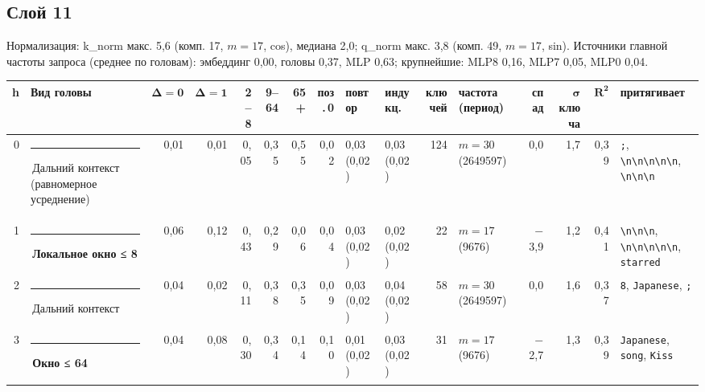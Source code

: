 \documentclass[10pt]{article}
\begin{document}
\noindent\begin{minipage}{\linewidth}
\subsection*{Слой 11}
{\small\color{ink2} Нормализация: k\_norm макс. 5,6 (комп. 17, $m{=}17$, cos), медиана 2,0; q\_norm макс. 3,8 (комп. 49, $m{=}17$, sin). Источники главной частоты запроса (среднее по головам): эмбеддинг 0,00, головы 0,37, MLP 0,63; крупнейшие: MLP8 0,16, MLP7 0,05, MLP0 0,04.}
\begin{center}{\footnotesize\begin{tabular}{|r|l|r|r|r|r|r|r|l|l|r|l|r|r|r|l|}
\hline
\rowcolor{head}\textbf{h} & \textbf{Вид головы} & $\boldsymbol{\Delta{=}0}$ & $\boldsymbol{\Delta{=}1}$ & \textbf{2–8} & \textbf{9–64} & \textbf{65+} & \textbf{поз.\,0} & \textbf{повтор} & \textbf{индукц.} & \textbf{ключей} & \textbf{частота (период)} & \textbf{спад} & $\boldsymbol{\sigma}$ \textbf{ключа} & $\boldsymbol{R^2}$ & \textbf{притягивает} \\ \hline
0 & \textcolor[HTML]{C3C2B7}{\rule{0.62em}{0.62em}}\,Дальний контекст (равномерное усреднение) & 0,01 & 0,01 & 0,05 & 0,35 & 0,55 & 0,02 & 0,03 (0,02) & 0,03 (0,02) & 124 & $m{=}30$ (2649597) & 0,0 & 1,7 & 0,39 & \texttt{\textvisiblespace{};}, \texttt{\textbackslash{}n\textbackslash{}n\textbackslash{}n\textbackslash{}n\textbackslash{}n}, \texttt{\textvisiblespace{}\textbackslash{}n\textbackslash{}n\textbackslash{}n} \\ \hline
1 & \textcolor[HTML]{1BAF7A}{\rule{0.62em}{0.62em}}\,\textbf{Локальное окно ≤ 8} & 0,06 & 0,12 & 0,43 & 0,29 & 0,06 & 0,04 & 0,03 (0,02) & 0,02 (0,02) & 22 & $m{=}17$ (9676) & $-$3,9 & 1,2 & 0,41 & \texttt{\textvisiblespace{}\textbackslash{}n\textbackslash{}n\textbackslash{}n}, \texttt{\textbackslash{}n\textbackslash{}n\textbackslash{}n\textbackslash{}n\textbackslash{}n}, \texttt{\textvisiblespace{}starred} \\ \hline
2 & \textcolor[HTML]{C3C2B7}{\rule{0.62em}{0.62em}}\,Дальний контекст & 0,04 & 0,02 & 0,11 & 0,38 & 0,35 & 0,09 & 0,03 (0,02) & 0,04 (0,02) & 58 & $m{=}30$ (2649597) & 0,0 & 1,6 & 0,37 & \texttt{8}, \texttt{\textvisiblespace{}Japanese}, \texttt{\textvisiblespace{};} \\ \hline
3 & \textcolor[HTML]{EDA100}{\rule{0.62em}{0.62em}}\,\textbf{Окно ≤ 64} & 0,04 & 0,08 & 0,30 & 0,34 & 0,14 & 0,10 & 0,01 (0,02) & 0,03 (0,02) & 31 & $m{=}17$ (9676) & $-$2,7 & 1,3 & 0,39 & \texttt{\textvisiblespace{}Japanese}, \texttt{\textvisiblespace{}song}, \texttt{\textvisiblespace{}Kiss} \\ \hline

\end{tabular}}
\end{center}
\end{minipage}
\end{document}
